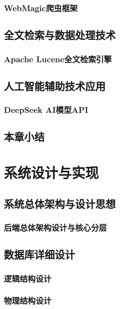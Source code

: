 \documentclass[a4paper,12pt]{ctexart}
\begin{document}
\subsubsection{WebMagic爬虫框架}

\subsection{全文检索与数据处理技术}

\subsubsection{Apache Lucene全文检索引擎}

\subsection{人工智能辅助技术应用}

\subsubsection{DeepSeek AI模型API}

\subsection{本章小结}

\section{系统设计与实现}

\subsection{系统总体架构与设计思想}

\subsubsection{后端总体架构设计与核心分层}

\subsection{数据库详细设计}

\subsubsection{逻辑结构设计}

\subsubsection{物理结构设计}
\end{document}
